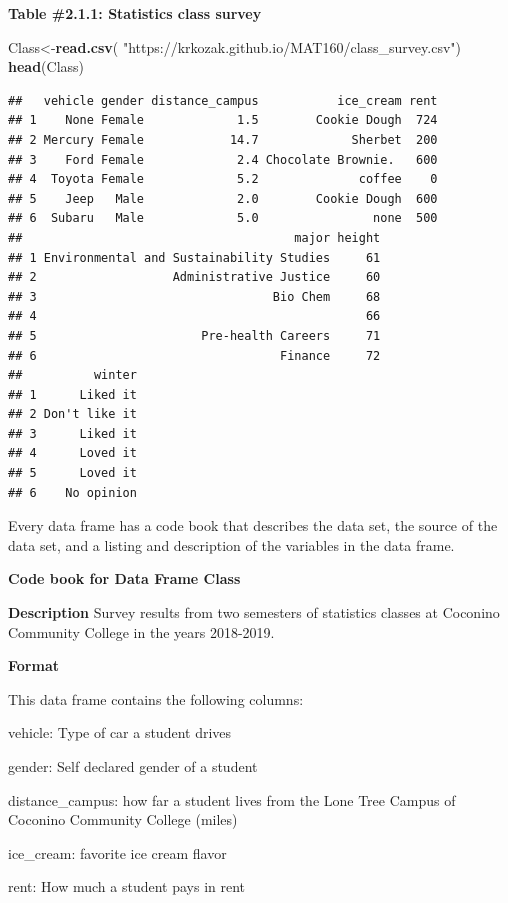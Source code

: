 \documentclass[
]{book}
\newenvironment{Shaded}{\begin{snugshade}}{\end{snugshade}}
\newcommand{\KeywordTok}[1]{\textcolor[rgb]{0.13,0.29,0.53}{\textbf{#1}}}
\newcommand{\NormalTok}[1]{#1}
\newcommand{\StringTok}[1]{\textcolor[rgb]{0.31,0.60,0.02}{#1}}
\begin{document}
\textbf{Table \#2.1.1: Statistics class survey}

\begin{Shaded}
\begin{Highlighting}[]
\NormalTok{Class<-}\KeywordTok{read.csv}\NormalTok{(}
  \StringTok{"https://krkozak.github.io/MAT160/class_survey.csv"}\NormalTok{)}
\KeywordTok{head}\NormalTok{(Class)}
\end{Highlighting}
\end{Shaded}

\begin{verbatim}
##   vehicle gender distance_campus           ice_cream rent
## 1    None Female             1.5        Cookie Dough  724
## 2 Mercury Female            14.7             Sherbet  200
## 3    Ford Female             2.4 Chocolate Brownie.   600
## 4  Toyota Female             5.2              coffee    0
## 5    Jeep   Male             2.0        Cookie Dough  600
## 6  Subaru   Male             5.0                none  500
##                                      major height
## 1 Environmental and Sustainability Studies     61
## 2                   Administrative Justice     60
## 3                                 Bio Chem     68
## 4                                              66
## 5                       Pre-health Careers     71
## 6                                  Finance     72
##          winter
## 1      Liked it
## 2 Don't like it
## 3      Liked it
## 4      Loved it
## 5      Loved it
## 6    No opinion
\end{verbatim}

Every data frame has a code book that describes the data set, the source of the data set, and a listing and description of the variables in the data frame.

\textbf{Code book for Data Frame Class}

\textbf{Description}
Survey results from two semesters of statistics classes at Coconino Community College in the years 2018-2019.

\textbf{Format}

This data frame contains the following columns:

vehicle: Type of car a student drives

gender: Self declared gender of a student

distance\_campus: how far a student lives from the Lone Tree Campus of Coconino Community College (miles)

ice\_cream: favorite ice cream flavor

rent: How much a student pays in rent
\end{document}
